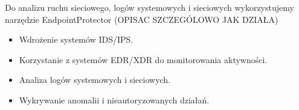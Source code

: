 Do analizu ruchu sieciowego, logów systemowych i sieciowych wykorzystujemy narzędzie EndpointProtector (OPISAC SZCZEGÓLOWO JAK DZIAŁA)
\begin{itemize}
    \item Wdrożenie systemów IDS/IPS.
    \item Korzystanie z systemów EDR/XDR do monitorowania aktywności.
    \item Analiza logów systemowych i sieciowych.
    \item Wykrywanie anomalii i nieautoryzowanych działań.
\end{itemize}
